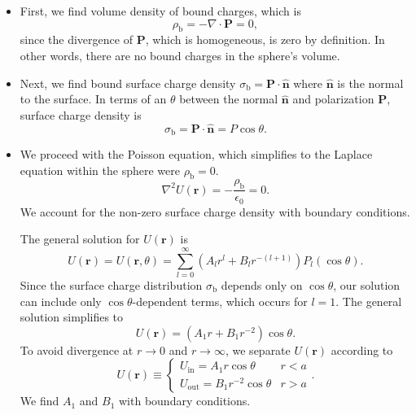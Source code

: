 \documentclass[11pt, a4paper]{article}
\renewcommand{\vec}[1]{\bm{#1}} %
\newcommand{\uvec}[1]{\hat{\vec{#1}}} %
\renewcommand{\r}{\vec{r}}
\newcommand{\ee}{\epsilon_{0}}  %
\renewcommand{\P}{\vec{P}}  %
\renewcommand{\div}{\nabla \cdot}
\renewcommand{\laplacian}{\nabla^{2}}
\begin{document}
\begin{itemize}
	\item First, we find volume density of bound charges, which is
	\begin{equation*}
		\rho_{\text{b}} = - \div \P = 0,
	\end{equation*}
	since the divergence of $ \P $, which is homogeneous, is zero by definition. In other words, there are no bound charges in the sphere's volume. 
	
	\item Next, we find bound surface charge density $ \sigma_{\text{b}} = \P \cdot \uvec{n} $ where $ \uvec{n} $ is the normal to the surface. In terms of an $ \theta $  between the normal $ \uvec{n} $ and polarization $ \P $, surface charge density is 
	\begin{equation*}
		\sigma_{\text{b}} = \P \cdot \uvec{n} = P \cos \theta.
	\end{equation*}
	
	\item We proceed with the Poisson equation, which simplifies to the Laplace equation within the sphere were $ \rho_{\text{b}} = 0 $. 
	\begin{equation*}
		\laplacian U(\r) = - \frac{\rho_{\text{b}}}{\ee} = 0.
	\end{equation*}
	We account for the non-zero surface charge density with boundary conditions. 
	
	The general solution for $ U(\r) $ is 
	\begin{equation*}
        U(\r) = U(\r, \theta) = \sum_{l = 0}^{\infty}(A_{l}r^{l} + B_{l}r^{-(l+1)})P_{l}(\cos \theta).
	\end{equation*}
	Since the surface charge distribution $ \sigma_{\text{b}} $ depends only on $ \cos \theta $, our solution can include only $ \cos \theta $-dependent terms, which occurs for $ l = 1 $. The general solution simplifies to
	\begin{equation*}
		U(\r) = (A_{1}r + B_{1}r^{-2})\cos \theta.
	\end{equation*}
	To avoid divergence at $ r \to 0 $ and $ r \to \infty $, we separate $ U(\r) $ according to
	\begin{equation*}
		U(\r) \equiv 
		\begin{cases}
			U_{\text{in}} = A_{1}r \cos \theta & r < a\\
			U_{\text{out}} = B_{1}r^{-2} \cos \theta & r > a
		\end{cases}.
	\end{equation*}
	We find $ A_{1} $ and $ B_{1} $ with  boundary conditions. 
	

\end{itemize}
\end{document}
